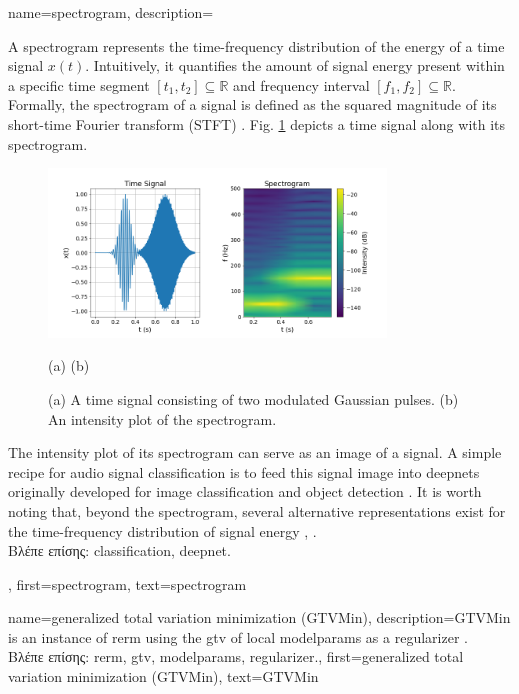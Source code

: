 {name={spectrogram},
	description={A spectrogram represents the time-frequency distribution of the energy of a time signal $x(t)$.  
		Intuitively, it quantifies the amount of signal energy present within a specific time segment 
		$[t_{1},t_{2}] \subseteq \mathbb{R}$ and frequency interval $[f_{1},f_{2}]\subseteq \mathbb{R}$. 
		Formally, the spectrogram of a signal is defined as the squared magnitude of its 
		short-time Fourier transform (STFT) \cite{cohen1995time}.
        		Fig. \ref{fig:spectrogram_dict} depicts a time signal along with its spectrogram. 
		\begin{figure}[H]
			\centering
			\includegraphics[width=0.8\textwidth]{assets/spectrogram.png}
			\begin{minipage}{\textwidth}
				\vspace{3ex}
				\centering
				{\selectfont (a) \hspace{10em} (b)}
			\end{minipage}
			\caption{(a) A time signal consisting of two modulated Gaussian pulses. (b) An intensity 
			plot of the spectrogram.
			\label{fig:spectrogram_dict}}
		\end{figure}
        		The intensity plot of its spectrogram can serve as an image of a signal. A 
		simple recipe for audio signal \gls{classification} is to feed this signal image 
		into \gls{deepnet}s originally developed for image \gls{classification} and object detection \cite{Li:2022aa}. 
		It is worth noting that, beyond the spectrogram, several alternative representations exist 
		for the time-frequency distribution of signal energy \cite{TimeFrequencyAnalysisBoashash}, \cite{MallatBook}.\\
		\foreignlanguage{greek}{Βλέπε επίσης:} \gls{classification}, \gls{deepnet}.}, 
	first={spectrogram},
	text={spectrogram}
}

{name={generalized total variation minimization (GTVMin)},
	description={GTVMin is an instance of \gls{rerm} 
		using the \gls{gtv} of local \gls{modelparams} as a \gls{regularizer} \cite{ClusteredFLTVMinTSP}.\\
		\foreignlanguage{greek}{Βλέπε επίσης:} \gls{rerm}, \gls{gtv}, \gls{modelparams}, \gls{regularizer}.},
	first={generalized total variation minimization (GTVMin)},
	text={GTVMin} 
}

